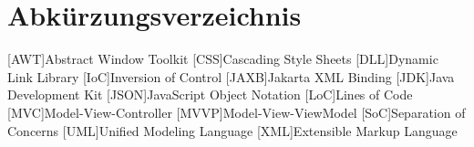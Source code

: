 \chapter*{Abkürzungsverzeichnis}
\label{abkürzungsverzeichnis}

\begin{acronym}
	[AWT]{Abstract Window Toolkit}
	[CSS]{Cascading Style Sheets}
	[DLL]{Dynamic Link Library}
	[IoC]{Inversion of Control}
	[JAXB]{Jakarta XML Binding}
	[JDK]{Java Development Kit}
	[JSON]{JavaScript Object Notation}
	[LoC]{Lines of Code}
	[MVC]{Model-View-Controller}
	[MVVP]{Model-View-ViewModel}
	[SoC]{Separation of Concerns}
	[UML]{Unified Modeling Language}
	[XML]{Extensible Markup Language}
\end{acronym}

